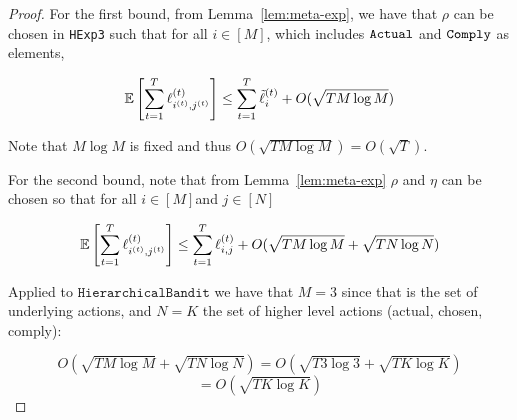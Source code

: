\begin{proof}
	For the first bound, from Lemma~\ref{lem:meta-exp}, we have that $\rho$ can be chosen in \texttt{HExp3} such that for all $i\in[M]$, which includes ${\texttt{Actual}}$ and ${\texttt{Comply}}$ as elements,
	
	\begin{equation}
		\operatorname*{\mathbb E}\left[\sum_{t=1}^T\ell^{(t)}_{i^{(t)},j^{(t)}}\right]
		\leq \sum_{t=1}^T \tilde{\ell}^{(t)}_{i}
		+ O(\sqrt{T M\log M})
	\end{equation}
	
	Note that $M\log M$ is fixed and thus  $ O(\sqrt{T M\log M}) =  O(\sqrt{T})$.
	
	For the second bound, note that from Lemma~\ref{lem:meta-exp} $\rho$ and $\eta$ can be chosen so that for all $i\in[M]$and $j\in[N]$
	
	\begin{equation}
		\operatorname*{\mathbb E}\left[\sum_{t=1}^{T} \ell^{(t)}_{i^{(t)},j^{(t)}}\right]
		\leq \sum_{t=1}^T\ell^{(t)}_{i,j}
		+ O(\sqrt{TM \log M} + \sqrt{T N\log N})
	\end{equation}
	
	Applied to $\texttt{HierarchicalBandit}$ we have that $M=3$ since that is the set of underlying actions, and  $N=K$ the set of higher level actions (actual, chosen, comply):
	
	$$ O(\sqrt{TM \log M} + \sqrt{T N\log N}) 
	= O(\sqrt{T 3\log 3} + \sqrt{TK \log K}) $$
	$$
	=  O(\sqrt{TK \log K})$$
	
	
	
\end{proof}


